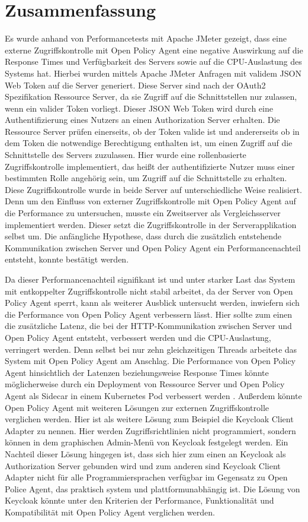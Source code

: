 \chapter{Zusammenfassung}
Es wurde anhand von Performancetests mit Apache JMeter gezeigt, dass eine externe Zugriffskontrolle mit Open Policy Agent eine negative Auswirkung auf die Response Times und Verfügbarkeit des Servers sowie auf die CPU-Auslastung des Systems hat. Hierbei wurden mittels Apache JMeter Anfragen mit validem JSON Web Token auf die Server generiert. Diese Server sind nach der OAuth2 Spezifikation Ressource Server, da sie Zugriff auf die Schnittstellen nur zulassen, wenn ein valider Token vorliegt. Dieser JSON Web Token wird durch eine Authentifizierung eines Nutzers an einen Authorization Server erhalten. Die Ressource Server prüfen einerseits, ob der Token valide ist und andererseits ob in dem Token die notwendige Berechtigung enthalten ist, um einen Zugriff auf die Schnittstelle des Servers zuzulassen. Hier wurde eine rollenbasierte Zugriffskontrolle implementiert, das heißt der authentifizierte Nutzer muss einer bestimmten Rolle angehörig sein, um Zugriff auf die Schnittstelle zu erhalten. Diese Zugriffskontrolle wurde in beide Server auf unterschiedliche Weise realisiert. Denn um den Einfluss von externer Zugriffskontrolle mit Open Policy Agent auf die Performance zu untersuchen, musste ein Zweitserver als Vergleichsserver implementiert werden. Dieser setzt die Zugriffskontrolle in der Serverapplikation selbst um. Die anfängliche Hypothese, dass durch die zusätzlich entstehende Kommunikation zwischen Server und Open Policy Agent ein Performancenachteil entsteht, konnte bestätigt werden.\bigskip

Da dieser Performancenachteil signifikant ist und unter starker Last das System mit entkoppelter Zugriffskontrolle nicht stabil arbeitet, da der Server von Open Policy Agent sperrt, kann als weiterer Ausblick untersucht werden, inwiefern sich die Performance von Open Policy Agent verbessern lässt. Hier sollte zum einen die zusätzliche Latenz, die bei der HTTP-Kommunikation zwischen Server und Open Policy Agent entsteht, verbessert werden und die CPU-Auslastung, verringert werden. Denn selbst bei nur zehn gleichzeitigen Threads arbeitete das System mit Open Policy Agent am Anschlag. Die Performance von Open Policy Agent hinsichtlich der Latenzen beziehungsweise Response Times könnte möglicherweise durch ein Deployment von Ressource Server und Open Policy Agent als Sidecar in einem Kubernetes Pod verbessert werden \citep{sidecar:2017}. Außerdem könnte Open Policy Agent mit weiteren Lösungen zur externen Zugriffskontrolle verglichen werden. Hier ist als weitere Lösung zum Beispiel die Keycloak Client Adapter zu nennen. Hier werden Zugriffsrichtlinien nicht programmiert, sondern können in dem graphischen Admin-Menü von Keycloak festgelegt werden. Ein Nachteil dieser Lösung hingegen ist, dass sich hier zum einen an Keycloak als Authorization Server gebunden wird und zum anderen sind Keycloak Client Adapter nicht für alle Programmiersprachen verfügbar im Gegensatz zu Open Police Agent, das praktisch system und plattformunabhängig ist. Die Lösung von Keycloak könnte unter den Kriterien der Performance, Funktionalität und Kompatibilität mit Open Policy Agent verglichen werden.

